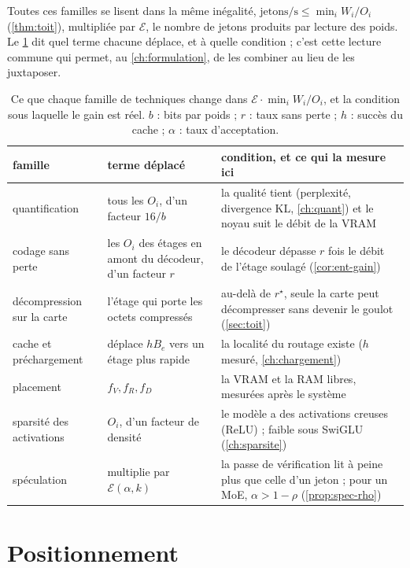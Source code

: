 Toutes ces familles se lisent dans la même inégalité, $\text{jetons/s} \le \min_i W_i / O_i$ (\cref{thm:toit}), multipliée par $\mathcal E$, le nombre de jetons produits par lecture des poids. Le \cref{tab:etat-leviers} dit quel terme chacune déplace, et à quelle condition ; c'est cette lecture commune qui permet, au \cref{ch:formulation}, de les combiner au lieu de les juxtaposer.

\begin{table}[ht]
\centering\small
\caption[Ce que chaque famille change dans l'inégalité du toit]{Ce que chaque famille de techniques change dans $\mathcal E \cdot \min_i W_i/O_i$, et la condition sous laquelle le gain est réel. $b$ : bits par poids ; $r$ : taux sans perte ; $h$ : succès du cache ; $\alpha$ : taux d'acceptation.}
\label{tab:etat-leviers}
\begin{tabularx}{\linewidth}{@{}>{\raggedright}p{2.7cm}>{\raggedright}p{3.4cm}>{\raggedright\arraybackslash}X@{}}
\toprule
famille & terme déplacé & condition, et ce qui la mesure ici \\
\midrule
quantification & tous les $O_i$, d'un facteur $16/b$ & la qualité tient (perplexité, divergence KL, \cref{ch:quant}) et le noyau suit le débit de la VRAM \\
codage sans perte & les $O_i$ des étages en amont du décodeur, d'un facteur $r$ & le décodeur dépasse $r$ fois le débit de l'étage soulagé (\cref{cor:ent-gain}) \\
décompression sur la carte & l'étage qui porte les octets compressés & au-delà de $r^\star$, seule la carte peut décompresser sans devenir le goulot (\cref{sec:toit}) \\
cache et préchargement & déplace $h B_e$ vers un étage plus rapide & la localité du routage existe ($h$ mesuré, \cref{ch:chargement}) \\
placement & $f_V, f_R, f_D$ & la VRAM et la RAM libres, mesurées après le système \\
sparsité des activations & $O_i$, d'un facteur de densité & le modèle a des activations creuses (ReLU) ; faible sous SwiGLU (\cref{ch:sparsite}) \\
spéculation & multiplie par $\mathcal E(\alpha, k)$ & la passe de vérification lit à peine plus que celle d'un jeton ; pour un MoE, $\alpha > 1 - \rho$ (\cref{prop:spec-rho}) \\
\bottomrule
\end{tabularx}
\end{table}

\section{Positionnement}\label{sec:positionnement}

